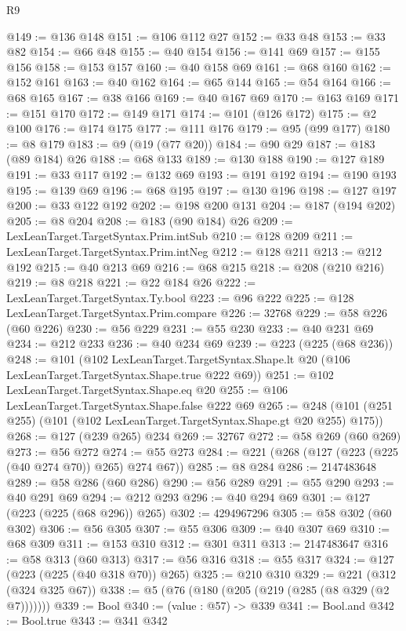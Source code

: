 \begin{lexlean}{R9}
\begin{coremodule}
@149 := @136 @148
@151 := @106 @112 @27
@152 := @33 @48
@153 := @33 @82
@154 := @66 @48
@155 := @40 @154
@156 := @141 @69
@157 := @155 @156
@158 := @153 @157
@160 := @40 @158 @69
@161 := @68 @160
@162 := @152 @161
@163 := @40 @162
@164 := @65 @144
@165 := @54 @164
@166 := @68 @165
@167 := @38 @166
@169 := @40 @167 @69
@170 := @163 @169
@171 := @151 @170
@172 := @149 @171
@174 := @101 (@126 @172)
@175 := @2 @100
@176 := @174 @175
@177 := @111 @176
@179 := @95 (@99 @177)
@180 := @8 @179
@183 := @9 (@19 (@77 @20))
@184 := @90 @29
@187 := @183 (@89 @184) @26
@188 := @68 @133
@189 := @130 @188
@190 := @127 @189
@191 := @33 @117
@192 := @132 @69
@193 := @191 @192
@194 := @190 @193
@195 := @139 @69
@196 := @68 @195
@197 := @130 @196
@198 := @127 @197
@200 := @33 @122 @192
@202 := @198 @200 @131
@204 := @187 (@194 @202)
@205 := @8 @204
@208 := @183 (@90 @184) @26
@209 := LexLeanTarget.TargetSyntax.Prim.intSub
@210 := @128 @209
@211 := LexLeanTarget.TargetSyntax.Prim.intNeg
@212 := @128 @211
@213 := @212 @192
@215 := @40 @213 @69
@216 := @68 @215
@218 := @208 (@210 @216)
@219 := @8 @218
@221 := @22 @184 @26
@222 := LexLeanTarget.TargetSyntax.Ty.bool
@223 := @96 @222
@225 := @128 LexLeanTarget.TargetSyntax.Prim.compare
@226 := 32768
@229 := @58 @226 (@60 @226)
@230 := @56 @229
@231 := @55 @230
@233 := @40 @231 @69
@234 := @212 @233
@236 := @40 @234 @69
@239 := @223 (@225 (@68 @236))
@248 := @101
    (@102
      LexLeanTarget.TargetSyntax.Shape.lt
      @20
      (@106 LexLeanTarget.TargetSyntax.Shape.true @222 @69))
@251 := @102 LexLeanTarget.TargetSyntax.Shape.eq @20
@255 := @106 LexLeanTarget.TargetSyntax.Shape.false @222 @69
@265 := @248 (@101 (@251 @255) (@101 (@102 LexLeanTarget.TargetSyntax.Shape.gt @20 @255) @175))
@268 := @127 (@239 @265) @234
@269 := 32767
@272 := @58 @269 (@60 @269)
@273 := @56 @272
@274 := @55 @273
@284 := @221 (@268 (@127 (@223 (@225 (@40 @274 @70)) @265) @274 @67))
@285 := @8 @284
@286 := 2147483648
@289 := @58 @286 (@60 @286)
@290 := @56 @289
@291 := @55 @290
@293 := @40 @291 @69
@294 := @212 @293
@296 := @40 @294 @69
@301 := @127 (@223 (@225 (@68 @296)) @265)
@302 := 4294967296
@305 := @58 @302 (@60 @302)
@306 := @56 @305
@307 := @55 @306
@309 := @40 @307 @69
@310 := @68 @309
@311 := @153 @310
@312 := @301 @311
@313 := 2147483647
@316 := @58 @313 (@60 @313)
@317 := @56 @316
@318 := @55 @317
@324 := @127 (@223 (@225 (@40 @318 @70)) @265)
@325 := @210 @310
@329 := @221 (@312 (@324 @325 @67))
@338 := @5 (@76 (@180 (@205 (@219 (@285 (@8 @329 (@2 @7)))))))
@339 := Bool
@340 := (value : @57) -> @339
@341 := Bool.and
@342 := Bool.true
@343 := @341 @342

\end{coremodule}
\end{lexlean}
